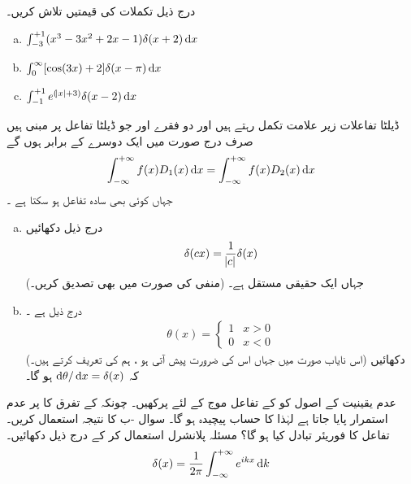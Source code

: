 درج ذیل تکملات کی قیمتیں تلاش کریں۔  
\begin{enumerate}[a.]
\item\(\int_{-3}^{+1}(x^{3}-3x^{2}+2x-1) \delta(x+2) \dif{x}\)
\item\( \int_{0}^{\infty}[\cos(3x)+2] \delta(x-\pi) \dif{x}\)
\item\(\int_{-1}^{+1}e^{(\abs x+3)} \delta (x-2) \dif{x}\)
\end{enumerate}
 ڈیلٹا تفاعلات  زیر علامت تکمل رہتے ہیں اور دو فقرے  اور جو ڈیلٹا تفاعل پر مبنی ہیں صرف درج صورت میں ایک دوسرے کے برابر ہوں گے
\begin{align*}
\int_{-\infty}^{+\infty}f(x) D_1(x) \dif x =\int_{-\infty}^{+\infty}f(x) D_2(x) \dif x
\end{align*}
 جہاں   کوئی بھی سادہ تفاعل ہو سکتا ہے  ۔
\begin{enumerate}[a.]
\item 
درج ذیل دکھائیں
 \begin{align}\delta(cx)=\frac{1}{\abs{c}}\delta(x)\end{align}
جہاں  ایک حقیقی مستقل ہے۔ (منفی    کی صورت میں بھی تصدیق کریں۔) 
\item 
{}  درج ذیل ہے ۔
\begin{align}
\theta(x)=
\begin{cases}
1&  x>0\\
0&  x<0
\end{cases}
\end{align}
 (اس نایاب صورت میں جہاں اس کی ضرورت پیش  آتی ہو ،  ہم  کی تعریف  کرتے ہیں۔)  دکھائیں کہ   \(\dif{\theta}/\dif{x}=\delta(x)\) ہو گا۔
\end{enumerate}
 عدم یقینیت کے اصول کو کے  تفاعل موج کے لئے پرکھیں۔  چونکہ  کے تفرق کا پر عدم استمرار پایا جاتا ہے لہٰذا  کا حساب پیچیدہ ہو گا۔ 
 سوال -ب  کا نتیجہ استعمال کریں۔   
 تفاعل    کا فوریئر تبادل کیا  ہو گا؟ مسئلہ پلانشرل استعمال کر کے  درج ذیل دکھائیں۔ 
\begin{align}\label{مساوات_شروڈنگر_ڈیلٹا_پلانشرال}
\delta(x)=\frac{1}{2\pi}\int_{-\infty}^{+\infty} e^{ikx} \dif{k}
\end{align}
